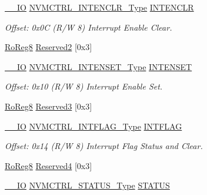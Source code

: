 \begin{DoxyCompactItemize}
\mbox{\hyperlink{core__cm0plus_8h_aec43007d9998a0a0e01faede4133d6be}{\+\_\+\+\_\+\+IO}} \mbox{\hyperlink{union_n_v_m_c_t_r_l___i_n_t_e_n_c_l_r___type}{N\+V\+M\+C\+T\+R\+L\+\_\+\+I\+N\+T\+E\+N\+C\+L\+R\+\_\+\+Type}} \mbox{\hyperlink{struct_nvmctrl_a8a070b37504a2280dfa92c874cd24466}{I\+N\+T\+E\+N\+C\+LR}}
\begin{DoxyCompactList}\small\item\em Offset\+: 0x0C (R/W 8) Interrupt Enable Clear. \end{DoxyCompactList}\item 
\mbox{\hyperlink{group___s_a_m_d21_e15_a__definitions_ga0d957f1433aaf5d70e4dc2b68288442d}{Ro\+Reg8}} \mbox{\hyperlink{struct_nvmctrl_a3e3d4b7e35d84b272d434a1396e8b7be}{Reserved2}} \mbox{[}0x3\mbox{]}
\item 
\mbox{\hyperlink{core__cm0plus_8h_aec43007d9998a0a0e01faede4133d6be}{\+\_\+\+\_\+\+IO}} \mbox{\hyperlink{union_n_v_m_c_t_r_l___i_n_t_e_n_s_e_t___type}{N\+V\+M\+C\+T\+R\+L\+\_\+\+I\+N\+T\+E\+N\+S\+E\+T\+\_\+\+Type}} \mbox{\hyperlink{struct_nvmctrl_ae3337ae94d80c7ace1f0d77ce2e33fed}{I\+N\+T\+E\+N\+S\+ET}}
\begin{DoxyCompactList}\small\item\em Offset\+: 0x10 (R/W 8) Interrupt Enable Set. \end{DoxyCompactList}\item 
\mbox{\hyperlink{group___s_a_m_d21_e15_a__definitions_ga0d957f1433aaf5d70e4dc2b68288442d}{Ro\+Reg8}} \mbox{\hyperlink{struct_nvmctrl_ab22abf5c83fa4a01809facc55e0fda29}{Reserved3}} \mbox{[}0x3\mbox{]}
\item 
\mbox{\hyperlink{core__cm0plus_8h_aec43007d9998a0a0e01faede4133d6be}{\+\_\+\+\_\+\+IO}} \mbox{\hyperlink{union_n_v_m_c_t_r_l___i_n_t_f_l_a_g___type}{N\+V\+M\+C\+T\+R\+L\+\_\+\+I\+N\+T\+F\+L\+A\+G\+\_\+\+Type}} \mbox{\hyperlink{struct_nvmctrl_a369472a8cad471612f923050e9c6cf9b}{I\+N\+T\+F\+L\+AG}}
\begin{DoxyCompactList}\small\item\em Offset\+: 0x14 (R/W 8) Interrupt Flag Status and Clear. \end{DoxyCompactList}\item 
\mbox{\hyperlink{group___s_a_m_d21_e15_a__definitions_ga0d957f1433aaf5d70e4dc2b68288442d}{Ro\+Reg8}} \mbox{\hyperlink{struct_nvmctrl_abf127d09ee1c1a9cf2b0d88d946dbe0a}{Reserved4}} \mbox{[}0x3\mbox{]}
\item 
\mbox{\hyperlink{core__cm0plus_8h_aec43007d9998a0a0e01faede4133d6be}{\+\_\+\+\_\+\+IO}} \mbox{\hyperlink{union_n_v_m_c_t_r_l___s_t_a_t_u_s___type}{N\+V\+M\+C\+T\+R\+L\+\_\+\+S\+T\+A\+T\+U\+S\+\_\+\+Type}} \mbox{\hyperlink{struct_nvmctrl_afd27d22d985df8b03cd6d9b9ae688b66}{S\+T\+A\+T\+US}}

\end{DoxyCompactItemize}
